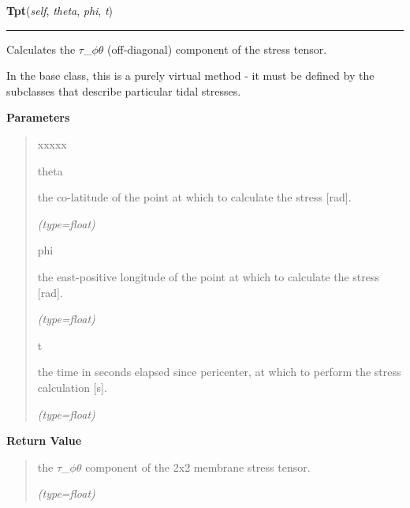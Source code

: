    \label{SatStress:SatStress:StressDef:Tpt}

    \vspace{0.5ex}

\hspace{.8\funcindent}\begin{boxedminipage}{\funcwidth}

    \raggedright \textbf{Tpt}(\textit{self}, \textit{theta}, \textit{phi}, \textit{t})

    \vspace{-1.5ex}

    \rule{\textwidth}{0.5\fboxrule}
\setlength{\parskip}{2ex}
    Calculates the \(\tau\)\_\(\phi\)\(\theta\) (off-diagonal) component of
    the stress tensor.

    In the base class, this is a purely virtual method - it must be defined
    by the subclasses that describe particular tidal stresses.

\setlength{\parskip}{1ex}
      \textbf{Parameters}
      \vspace{-1ex}

      \begin{quote}
        \begin{Ventry}{xxxxx}

          \item[theta]

          the co-latitude of the point at which to calculate the stress 
          [rad].

            {\it (type=float)}

          \item[phi]

          the east-positive longitude of the point at which to calculate 
          the stress [rad].

            {\it (type=float)}

          \item[t]

          the time in seconds elapsed since pericenter, at which to perform
          the stress calculation [s].

            {\it (type=float)}

        \end{Ventry}

      \end{quote}

      \textbf{Return Value}
    \vspace{-1ex}

      \begin{quote}
      the \(\tau\)\_\(\phi\)\(\theta\) component of the 2x2 membrane stress
      tensor.

      {\it (type=float)}

      \end{quote}

    \end{boxedminipage}


